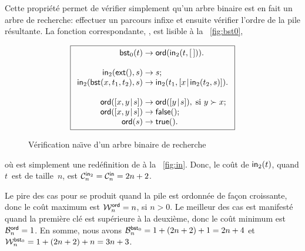 Cette propriété permet de vérifier simplement qu'un arbre binaire est
en fait un arbre de recherche: effectuer un parcours infixe et ensuite
vérifier l'ordre de la pile résultante. La fonction correspondante,
, est lisible à la
\fig~\vref{fig:bst0},
\begin{figure}[t]
\begin{equation*}
\boxed{
\begin{array}{r@{\;}l@{\;}l}
\fun{bst}_0(t) & \rightarrow & \fun{ord}(\fun{in}_2(t,\el)).\\
\\
\fun{in}_2(\fun{ext}(),s) & \rightarrow & s;\\
\fun{in}_2(\fun{bst}(x,t_1,t_2),s) & \rightarrow
  & \fun{in}_2(t_1,\cons{x}{\fun{in}_2(t_2,s)}).\\
\\
\fun{ord}(\cons{x,y}{s}) & \rightarrow & \fun{ord}(\cons{y}{s}),
\;\text{si \(y \succ x\)};\\
\fun{ord}(\cons{x,y}{s}) & \rightarrow & \fun{false}();\\
\fun{ord}(s) & \rightarrow & \fun{true}().
\end{array}}
\end{equation*}
\caption{Vérification na\"{\i}ve d'un arbre binaire de recherche
\label{fig:bst0}}
\end{figure}
où  est simplement une
redéfinition de  à la
\fig~\vref{fig:in}. Donc, le coût de \(\fun{in}_2(t)\), quand
\(t\)~est de taille~\(n\), est \(\C{\fun{in}_2}{n} = \C{\fun{in}}{n} =
2n + 2\).

Le pire des cas pour  se produit
quand la pile est ordonnée de façon croissante, donc le coût maximum
est \(\W{\fun{ord}}{n} = n\), si \(n > 0\). Le meilleur des cas est
manifesté quand la première clé est supérieure à la deuxième, donc le
coût minimum est \(\B{\fun{ord}}{n} = 1\). En somme, nous avons
\(\B{\fun{bst}_0}{n} = 1 + (2n+2) + 1 = 2n + 4\) et
\(\W{\fun{bst}_0}{n} = 1 + (2n+2) + n = 3n + 3\).

